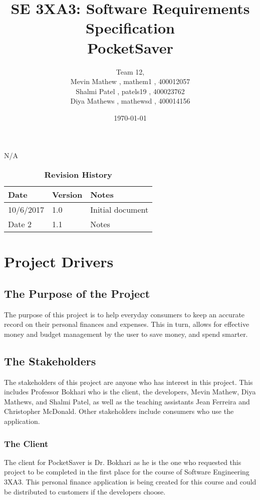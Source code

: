 \documentclass[12pt, titlepage]{article}
\title{SE 3XA3: Software Requirements Specification\\PocketSaver}
\author{Team 12, 
		\\ Mevin Mathew , mathem1 , 400012057
		\\ Shalmi Patel , patels19 , 400023762
		\\ Diya Mathews , mathewsd , 400014156
}
\date{\today}
\begin{document}
\maketitle

\tableofcontents
\listoftables
\listoffigures
N/A

\begin{table}[bp]
\caption{\bf Revision History}
\begin{tabularx}{\textwidth}{p{3cm}p{2cm}X}
\toprule {\bf Date} & {\bf Version} & {\bf Notes}\\
\midrule
10/6/2017 & 1.0 & Initial document\\
Date 2 & 1.1 & Notes\\
\bottomrule
\end{tabularx}
\end{table}

\newpage



\section{Project Drivers}

\subsection{The Purpose of the Project}
The purpose of this project is to help everyday consumers to keep an accurate record on their personal finances and expenses. This in turn, allows for effective money and budget management by the user to save money, and spend smarter. 
\subsection{The Stakeholders}
The stakeholders of this project are anyone who has interest in this project. This includes Professor Bokhari who is the client, the developers, Mevin Mathew, Diya Mathews, and Shalmi Patel, as well as the teaching assistants Jean Ferreira and Christopher McDonald. Other stakeholders include consumers who use the application.
\subsubsection{The Client}
The client for PocketSaver is Dr. Bokhari  as he is the one who requested this project to be completed in the first place for the course of Software Engineering 3XA3. This personal finance application is being created for this course and could be distributed to customers if the developers choose.
\end{document}

